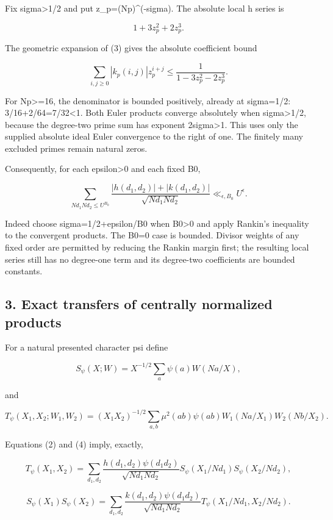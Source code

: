 Fix sigma\textgreater1/2 and put z\_\allowbreak{}p=(Np)\^{}(-sigma). The absolute local h series is

\[
 1+3z_p^2+2z_p^3.
\]

The geometric expansion of (3) gives the absolute coefficient bound

\[
 \sum_{i,j\ge0}|k_p(i,j)|z_p^{i+j}
 \le\frac1{1-3z_p^2-2z_p^3}.                   \tag{5}
\]

For Np\textgreater=16, the denominator is bounded positively, already at sigma=1/2: 3/16+2/64=7/32\textless1. Both Euler products converge absolutely when sigma\textgreater1/2, because the degree-two prime sum has exponent 2sigma\textgreater1. This uses only the supplied absolute ideal Euler convergence to the right of one. The finitely many excluded primes remain natural zeros.

Consequently, for each epsilon\textgreater0 and each fixed B0,

\[
 \sum_{Nd_1Nd_2\le U^{B_0}}
 \frac{|h(d_1,d_2)|+|k(d_1,d_2)|}{\sqrt{Nd_1Nd_2}}
 \ll_{\epsilon,B_0} U^\epsilon.                \tag{6}
\]

Indeed choose sigma=1/2+epsilon/B0 when B0\textgreater0 and apply Rankin's inequality to the convergent products. The B0=0 case is bounded. Divisor weights of any fixed order are permitted by reducing the Rankin margin first; the resulting local series still has no degree-one term and its degree-two coefficients are bounded constants.

\hypertarget{sources:exact-transfers-of-centrally-normalized-products}{%
\subsection{3. Exact transfers of centrally normalized products}\label{sources:exact-transfers-of-centrally-normalized-products}}

For a natural presented character psi define

\[
 S_\psi(X;W)=X^{-1/2}\sum_a\psi(a)W(Na/X),
\]

and

\[
 T_\psi(X_1,X_2;W_1,W_2)
 =(X_1X_2)^{-1/2}\sum_{a,b}\mu^2(ab)\psi(ab)
 W_1(Na/X_1)W_2(Nb/X_2).
\]

Equations (2) and (4) imply, exactly,

\[
 T_\psi(X_1,X_2)
 =\sum_{d_1,d_2}\frac{h(d_1,d_2)\psi(d_1d_2)}
 {\sqrt{Nd_1Nd_2}}
 S_\psi(X_1/Nd_1)S_\psi(X_2/Nd_2),              \tag{7}
\]

\[
 S_\psi(X_1)S_\psi(X_2)
 =\sum_{d_1,d_2}\frac{k(d_1,d_2)\psi(d_1d_2)}
 {\sqrt{Nd_1Nd_2}}
 T_\psi(X_1/Nd_1,X_2/Nd_2).                     \tag{8}
\]

